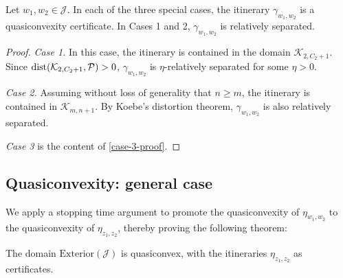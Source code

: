 \begin{lemma}
\label{case 1 rel. sep}
Let $w_1,w_2 \in \mathcal J$. In each of the three special cases, the itinerary $\gamma _{w_1,w_2}$ is a quasiconvexity certificate. In Cases 1 and 2, $\gamma _{w_1,w_2}$ is relatively separated.
\end{lemma}

\begin{proof}
\emph{Case 1.} In this case, the itinerary is contained in the domain $\mathcal K_{2, C_2+1}$.
Since $\operatorname{dist}(\mathcal K_{2, C_2+1}, \mathcal P)>0$, $\gamma _{w_1,w_2}$ is $\eta$-relatively separated for some $\eta>0$. 

\emph{Case 2.}
Assuming without loss of generality that $n \geq m$, the itinerary is contained in $\mathcal K_{m,n+1}$. By Koebe's distortion theorem, $\gamma _{w_1,w_2}$ is also relatively separated.

\emph{Case 3} is the content of \cref{case-3-proof}.
\end{proof}

\subsection{Quasiconvexity: general case}
We apply a stopping time argument to promote the quasiconvexity of $\eta_{w_1,w_2}$ to the quasiconvexity of $\eta_{z_1,z_2}$, thereby proving the following theorem:

\begin{theorem} \label{quasiconvex-Cauliflower}
	The domain $\mathrm{Exterior}(\mathcal{J})$ is quasiconvex, with the itineraries $\eta_{z_1,z_2}$ as certificates.
\end{theorem}

